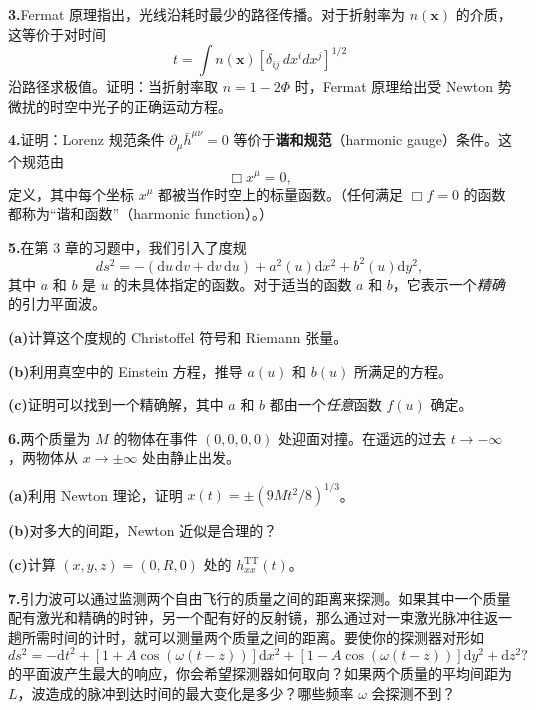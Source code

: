 
\textbf{3.}\quad Fermat 原理指出，光线沿耗时最少的路径传播。对于折射率为 $n(\mathbf{x})$ 的介质，这等价于对时间
\begin{equation*}
t = \int n(\mathbf{x})\left[\delta_{ij}\, dx^i dx^j\right]^{1/2}
\tag{7.204}
\end{equation*}
沿路径求极值。证明：当折射率取 $n = 1 - 2\Phi$ 时，Fermat 原理给出受 Newton 势微扰的时空中光子的正确运动方程。

\textbf{4.}\quad 证明：Lorenz 规范条件 $\partial_\mu\bar{h}^{\mu\nu} = 0$ 等价于\textbf{谐和规范}（harmonic gauge）条件。这个规范由
\begin{equation*}
\Box x^\mu = 0,
\tag{7.205}
\end{equation*}
定义，其中每个坐标 $x^\mu$ 都被当作时空上的标量函数。（任何满足 $\Box f = 0$ 的函数都称为“谐和函数”（harmonic function）。）

\textbf{5.}\quad 在第 3 章的习题中，我们引入了度规
\begin{equation*}
ds^2 = -(\mathrm{d}u\,\mathrm{d}v + \mathrm{d}v\,\mathrm{d}u) + a^2(u)\mathrm{d}x^2 + b^2(u)\mathrm{d}y^2,
\tag{7.206}
\end{equation*}
其中 $a$ 和 $b$ 是 $u$ 的未具体指定的函数。对于适当的函数 $a$ 和 $b$，它表示一个\emph{精确}的引力平面波。

\textbf{(a)}\quad 计算这个度规的 Christoffel 符号和 Riemann 张量。

\textbf{(b)}\quad 利用真空中的 Einstein 方程，推导 $a(u)$ 和 $b(u)$ 所满足的方程。

\textbf{(c)}\quad 证明可以找到一个精确解，其中 $a$ 和 $b$ 都由一个\emph{任意}函数 $f(u)$ 确定。

\textbf{6.}\quad 两个质量为 $M$ 的物体在事件 $(0,0,0,0)$ 处迎面对撞。在遥远的过去 $t \to -\infty$，两物体从 $x \to \pm\infty$ 处由静止出发。

\textbf{(a)}\quad 利用 Newton 理论，证明 $x(t) = \pm(9Mt^2/8)^{1/3}$。

\textbf{(b)}\quad 对多大的间距，Newton 近似是合理的？

\textbf{(c)}\quad 计算 $(x, y, z) = (0, R, 0)$ 处的 $h^{\mathrm{TT}}_{xx}(t)$。

\textbf{7.}\quad 引力波可以通过监测两个自由飞行的质量之间的距离来探测。如果其中一个质量配有激光和精确的时钟，另一个配有好的反射镜，那么通过对一束激光脉冲往返一趟所需时间的计时，就可以测量两个质量之间的距离。要使你的探测器对形如
\begin{equation*}
ds^2 = -\mathrm{d}t^2 + \left[1 + A\cos(\omega(t-z))\right]\mathrm{d}x^2 + \left[1 - A\cos(\omega(t-z))\right]\mathrm{d}y^2 + \mathrm{d}z^2?
\end{equation*}
的平面波产生最大的响应，你会希望探测器如何取向？如果两个质量的平均间距为 $L$，波造成的脉冲到达时间的最大变化是多少？哪些频率 $\omega$ 会探测不到？

